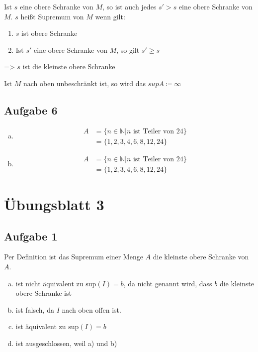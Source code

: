 \documentclass{article}
\begin{document}
Ist $s$ eine obere Schranke von $M$, so ist auch jedes $s' > s$ eine obere Schranke von $M$. $s$ heißt Supremum von
$M$ wenn gilt:
\begin{enumerate}
\item $s$ ist obere Schranke
\item Ist $s'$ eine obere Schranke von $M$, so gilt $s' \geq s$
\end{enumerate}

=> $s$ ist die kleinste obere Schranke

Ist $M$ nach oben unbeschränkt ist, so wird das  $sup A \coloneq \infty$

\subsection*{Aufgabe 6}
\begin{enumerate}[(a)]
\item
  \begin{align*}
    A &= \{ n \in \mathbb{N} | n \text{ ist Teiler von } 24\} \\
      &= \{ 1,2,3,4,6,8,12,24 \}
  \end{align*}
\item
\begin{align*}
    A &= \{ n \in \mathbb{N} | n \text{ ist Teiler von } 24\} \\
      &= \{ 1,2,3,4,6,8,12,24 \}
  \end{align*}  
\end{enumerate}

\section*{Übungsblatt 3}

\subsection*{Aufgabe 1}

Per Definition ist das Supremum einer Menge $A$ die kleinste obere Schranke von $A$.

\begin{enumerate}[a)]
\item ist nicht äquivalent zu $\text{sup}(I) = b$, da nicht genannt wird, dass $b$ die kleinste
  obere Schranke ist
\item ist falsch, da $I$ nach oben offen ist.
\item ist äquivalent zu $\text{sup}(I) = b$
\item ist ausgeschlossen, weil a) und b)
\end{enumerate}
\end{document}
